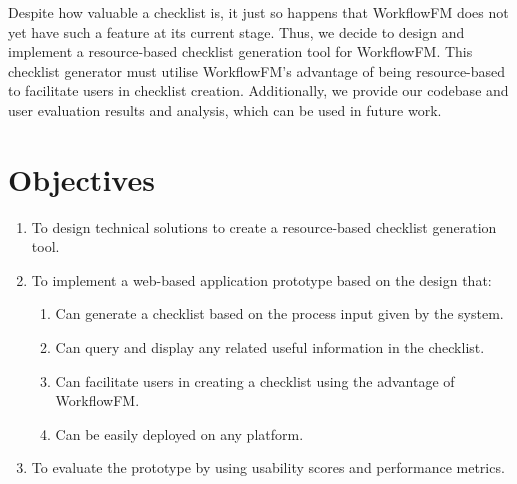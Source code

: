 Despite how valuable a checklist is, it just so happens that WorkflowFM does not yet have such a feature at its current stage. Thus, we decide to design and implement a resource-based checklist generation tool for WorkflowFM.
This checklist generator must utilise WorkflowFM's advantage of being resource-based to facilitate users in checklist creation. Additionally, we provide our codebase and user evaluation results and analysis, which can be used in future work.







\section{Objectives}
\begin{enumerate}
    \item To design technical solutions to create a resource-based checklist generation tool.
    \item To implement a web-based application prototype based on the design that:
    \begin{enumerate}
        \item Can generate a checklist based on the process input given by the system.
        \item Can query and display any related useful information in the checklist.
        \item Can facilitate users in creating a checklist using the advantage of WorkflowFM.
        \item Can be easily deployed on any platform.
    \end{enumerate}
    \item To evaluate the prototype by using usability scores and performance metrics.
\end{enumerate}


